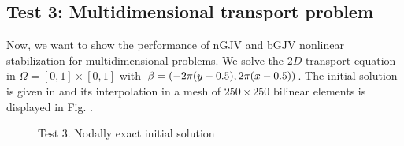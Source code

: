 \subsection{Test 3: Multidimensional transport problem} 
Now, we want to show the performance of nGJV and bGJV nonlinear stabilization for multidimensional problems. We solve the $2D$ transport equation  in $\Omega = [0,1]\times[0,1]$ with $\beta=(-2\pi (y-0.5), 2\pi (x-0.5))$. The initial solution is given in \cite{dmitri_kuzmin_guide_2010} and its interpolation in a mesh of $250\times250$ bilinear elements is displayed in Fig. . %
 

\begin{figure}%
\centering
{}%
\caption{Test 3. Nodally exact initial solution}\label{fig-algo}
\end{figure}


